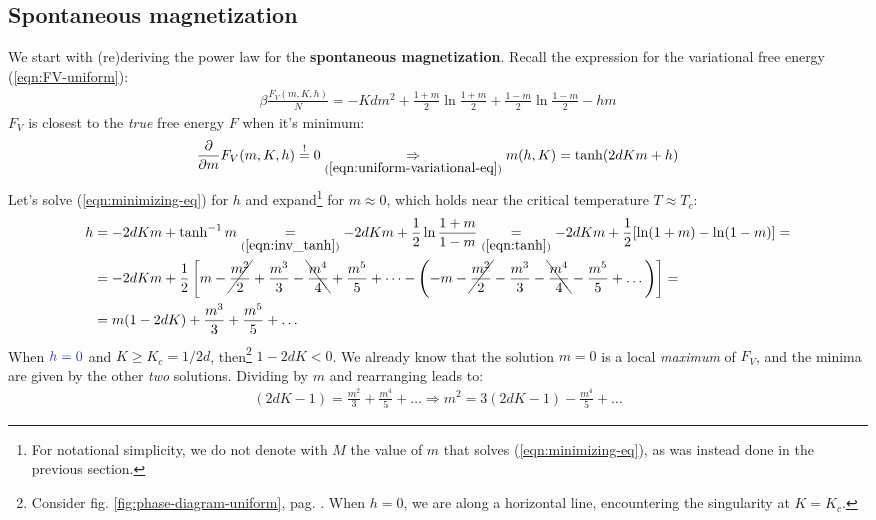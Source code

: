 \documentclass[../../main.tex]{subfiles}
\begin{document}
\subsection{Spontaneous magnetization}
We start with (re)deriving the power law for the \textbf{spontaneous magnetization}. Recall the expression for the variational free energy (\ref{eqn:FV-uniform}):
\begin{align}\label{eqn:FV-uniform2}
    \beta \frac{F_V(m,K,h)}{N} = - K d m^2 + \frac{1+m}{2} \ln \frac{1+m}{2} + \frac{1-m}{2} \ln \frac{1-m}{2} - hm   
\end{align}
$F_V$ is closest to the \textit{true}  free energy $F$ when it's minimum:
\begin{align}\label{eqn:minimizing-eq}
    \pdv{m} F_V(m, K, h) \overset{!}{=} 0 \underset{(\ref{eqn:uniform-variational-eq})}{\Rightarrow}  m(h,K) = \tanh(2d K m + h)
\end{align} 
Let's solve (\ref{eqn:minimizing-eq}) for $h$ and expand\footnote{For notational simplicity, we do not denote with $M$ the value of $m$ that solves (\ref{eqn:minimizing-eq}), as was instead done in the previous section.} for $m \approx 0$, which holds near the critical temperature $T \approx T_c$:
\begin{align}\nonumber
    h &= -2dKm + \tanh^{-1}m  \underset{(\ref{eqn:inv_tanh})}{=} -2dKm + \frac{1}{2} \ln \frac{1+m}{1-m} \underset{(\ref{eqn:tanh})}{=} -2dKm + \frac{1}{2}[\ln(1+m) - \ln(1-m)] =\\ \nonumber
    &= -2dKm +\frac{1}{2}\left[m-\cancel{\frac{m^2}{2}}+\frac{m^3}{3}-\bcancel{\frac{m^4}{4}}+\frac{m^5}{5}+\dots  - \left(-m -\cancel{\frac{m^2}{2}} -\frac{m^3}{3} -\bcancel{\frac{m^4}{4} }-\frac{m^5}{5} + \dots    \right) \right] =\\
    &= m(1-2dK) + \frac{m^3}{3} + \frac{m^5}{5} + \dots  \label{eqn:h-eq} 
\end{align}
When $\textcolor{Blue}{h=0}$ and $K \geq K_c = 1/2d$, then\footnote{Consider fig. \ref{fig:phase-diagram-uniform}, pag. \pageref{fig:phase-diagram-uniform}. When $h=0$, we are  along a horizontal line, encountering the singularity at $K = K_c$.} $1-2dK < 0$. We already know that the solution $m=0$ is a local \textit{maximum} of $F_V$, and the minima are given by the other \textit{two} solutions. Dividing by $m$ and rearranging leads to:
\begin{align*}
    (2dK-1) = \frac{m^2}{3} + \frac{m^4}{5} + \dots \Rightarrow  m^2 = 3(2dK - 1) - \frac{m^4}{5} + \dots
\end{align*}
\end{document}
